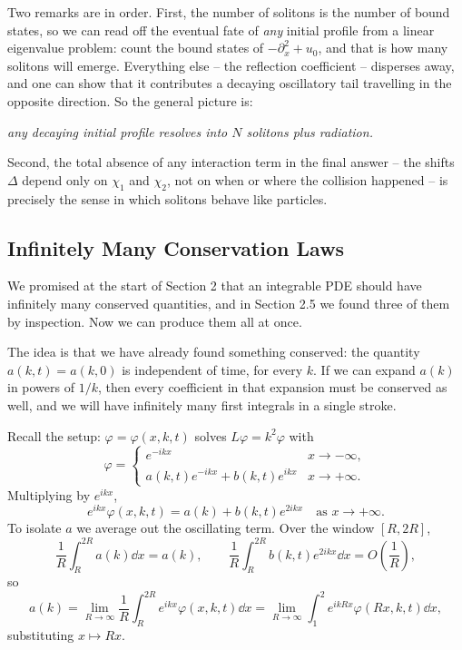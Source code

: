 Two remarks are in order. First, the number of solitons is the number of bound states, so we can read off the eventual fate of \emph{any} initial profile from a linear eigenvalue problem: count the bound states of $-\partial_x^2 + u_0$, and that is how many solitons will emerge. Everything else -- the reflection coefficient -- disperses away, and one can show that it contributes a decaying oscillatory tail travelling in the opposite direction. So the general picture is:
\begin{center}
	\emph{any decaying initial profile resolves into $N$ solitons plus radiation.}
\end{center}
Second, the total absence of any interaction term in the final answer -- the shifts $\Delta$ depend only on $\chi_1$ and $\chi_2$, not on when or where the collision happened -- is precisely the sense in which solitons behave like particles.

\subsection{Infinitely Many Conservation Laws}

We promised at the start of Section 2 that an integrable PDE should have infinitely many conserved quantities, and in Section 2.5 we found three of them by inspection. Now we can produce them all at once.

The idea is that we have already found something conserved: the quantity $a(k,t) = a(k,0)$ is independent of time, for every $k$. If we can expand $a(k)$ in powers of $1/k$, then every coefficient in that expansion must be conserved as well, and we will have infinitely many first integrals in a single stroke.

Recall the setup: $\varphi = \varphi(x,k,t)$ solves $L\varphi = k^2\varphi$ with
$$
\varphi = \begin{cases}e^{-ikx} & x\to-\infty,\\ a(k,t)e^{-ikx} + b(k,t)e^{ikx} & x\to+\infty.\end{cases}
$$
Multiplying by $e^{ikx}$,
$$
e^{ikx}\varphi(x,k,t) = a(k) + b(k,t)e^{2ikx}\quad\text{as }x\to+\infty.
$$
To isolate $a$ we average out the oscillating term. Over the window $[R, 2R]$,
$$
\frac{1}{R}\int_R^{2R}a(k)\dd x = a(k), \qquad \frac{1}{R}\int_R^{2R}b(k,t)e^{2ikx}\dd x = O\!\left(\frac{1}{R}\right),
$$
so
$$
a(k) = \lim_{R\to\infty}\frac{1}{R}\int_R^{2R}e^{ikx}\varphi(x,k,t)\dd x = \lim_{R\to\infty}\int_1^2e^{ikRx}\varphi(Rx,k,t)\dd x,
$$
substituting $x\mapsto Rx$.

